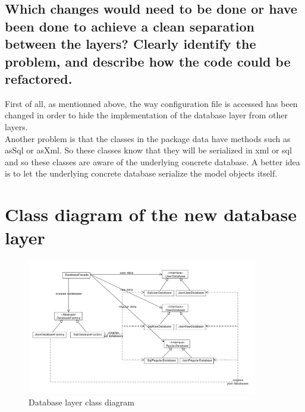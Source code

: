 \documentclass[a4paper,10pt]{article}
\begin{document}
\subsection{Which changes would need to be done or have been done to achieve a clean separation between the layers? Clearly identify the problem, and describe how the code could be refactored.}
First of all, as mentionned above, the way configuration file is accessed has been changed in order to hide the implementation of the database layer from other layers.\\
Another problem is that the classes in the package data have methods such as asSql or asXml. So these classes know that they will be serialized in xml or sql and so these classes are aware of the underlying concrete database. A better idea is to let the underlying concrete database serialize the model objects itself.
\newpage
\section{Class diagram of the new database layer}
\begin{center}
\begin{figure}[h]
  \centerline{\includegraphics[width=0.9\textwidth]{class-diagram.pdf}}
  \caption{Database layer class diagram}
\end{figure}
\end{center}
\end{document}
